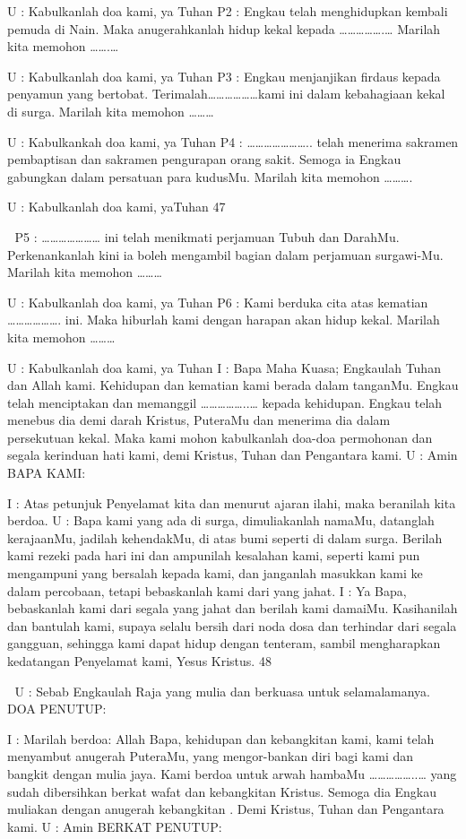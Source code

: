 \documentclass[10pt,a5paper,fancyhdr]{memoir}
\begin{document}
U : Kabulkanlah doa kami, ya Tuhan 
P2 : Engkau telah menghidupkan kembali pemuda di Nain. Maka 
anugerahkanlah hidup kekal kepada …………….… Marilah kita 
memohon …….… 

U : Kabulkanlah doa kami, ya Tuhan 
P3 : Engkau menjanjikan firdaus kepada penyamun yang bertobat. 
Terimalah………………kami ini dalam kebahagiaan kekal di surga. 
Marilah kita memohon ……… 

U : Kabulkankah doa kami, ya Tuhan 
P4 : ………………….. telah menerima sakramen pembaptisan dan 
sakramen pengurapan orang sakit. Semoga ia Engkau gabungkan 
dalam persatuan para kudusMu. Marilah kita memohon ………. 

U : Kabulkanlah doa kami, yaTuhan 
47 



P5 : ………………… ini telah menikmati perjamuan Tubuh dan 
DarahMu. Perkenankanlah kini ia boleh mengambil bagian dalam 
perjamuan surgawi-Mu. Marilah kita memohon ……… 

U : Kabulkanlah doa kami, ya Tuhan 
P6 : Kami berduka cita atas kematian ………………. ini. Maka 
hiburlah kami dengan harapan akan hidup kekal. Marilah kita 
memohon ……… 

U : Kabulkanlah doa kami, ya Tuhan 
I : Bapa Maha Kuasa; Engkaulah Tuhan dan Allah kami. Kehidupan 
dan kematian kami berada dalam tanganMu. Engkau telah 
menciptakan dan memanggil ……………..… kepada kehidupan. 
Engkau telah menebus dia demi darah Kristus, PuteraMu dan 
menerima dia dalam persekutuan kekal. Maka kami mohon 
kabulkanlah doa-doa permohonan dan segala kerinduan hati kami, 
demi Kristus, Tuhan dan Pengantara kami. 
U : Amin 
BAPA KAMI: 

I : Atas petunjuk Penyelamat kita dan menurut ajaran ilahi, maka 
beranilah kita berdoa. 
U : Bapa kami yang ada di surga, dimuliakanlah namaMu, datanglah 
kerajaanMu, jadilah kehendakMu, di atas bumi seperti di dalam 
surga. Berilah kami rezeki pada hari ini dan ampunilah kesalahan 
kami, seperti kami pun mengampuni yang bersalah kepada kami, dan 
janganlah masukkan kami ke dalam percobaan, tetapi bebaskanlah 
kami dari yang jahat. 
I : Ya Bapa, bebaskanlah kami dari segala yang jahat dan berilah 
kami damaiMu. Kasihanilah dan bantulah kami, supaya selalu bersih 
dari noda dosa dan terhindar dari segala gangguan, sehingga kami 
dapat hidup dengan tenteram, sambil mengharapkan kedatangan 
Penyelamat kami, Yesus Kristus. 
48 



U : Sebab Engkaulah Raja yang mulia dan berkuasa untuk selamalamanya. 
DOA PENUTUP: 

I : Marilah berdoa: 
Allah Bapa, kehidupan dan kebangkitan kami, kami telah menyambut 
anugerah PuteraMu, yang mengor-bankan diri bagi kami dan bangkit 
dengan mulia jaya. Kami berdoa untuk arwah hambaMu 
……………..… yang sudah dibersihkan berkat wafat dan 
kebangkitan Kristus. Semoga dia Engkau muliakan dengan anugerah 
kebangkitan . Demi Kristus, Tuhan dan Pengantara kami. 
U : Amin 
BERKAT PENUTUP: 
\end{document}
